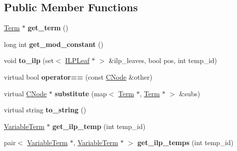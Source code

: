 \subsection*{\-Public \-Member \-Functions}
\begin{DoxyCompactItemize}
\item 
\hypertarget{classModLeaf_a5828eba46e2ec9de959db626779f3337}{\hyperlink{classTerm}{\-Term} $\ast$ {\bfseries get\-\_\-term} ()}\label{classModLeaf_a5828eba46e2ec9de959db626779f3337}

\item 
\hypertarget{classModLeaf_ae41cfdbd628e3ef2055527d7a9a332f4}{long int {\bfseries get\-\_\-mod\-\_\-constant} ()}\label{classModLeaf_ae41cfdbd628e3ef2055527d7a9a332f4}

\item 
\hypertarget{classModLeaf_a92f1a0251e0c32a27387ac2b9599a2c9}{void {\bfseries to\-\_\-ilp} (set$<$ \hyperlink{classILPLeaf}{\-I\-L\-P\-Leaf} $\ast$ $>$ \&ilp\-\_\-leaves, bool pos, int temp\-\_\-id)}\label{classModLeaf_a92f1a0251e0c32a27387ac2b9599a2c9}

\item 
\hypertarget{classModLeaf_a9edb8af1b7ff81da17b099391a435b26}{virtual bool {\bfseries operator==} (const \hyperlink{classCNode}{\-C\-Node} \&other)}\label{classModLeaf_a9edb8af1b7ff81da17b099391a435b26}

\item 
\hypertarget{classModLeaf_a415e2fed13664bf2b850bb76d068c843}{virtual \hyperlink{classCNode}{\-C\-Node} $\ast$ {\bfseries substitute} (map$<$ \hyperlink{classTerm}{\-Term} $\ast$, \hyperlink{classTerm}{\-Term} $\ast$ $>$ \&subs)}\label{classModLeaf_a415e2fed13664bf2b850bb76d068c843}

\item 
\hypertarget{classModLeaf_aea07a828e00ab8f36326e3bcc16eb72f}{virtual string {\bfseries to\-\_\-string} ()}\label{classModLeaf_aea07a828e00ab8f36326e3bcc16eb72f}

\item 
\hypertarget{classModLeaf_a313b14e933bbf213c3ff378e82919918}{\hyperlink{classVariableTerm}{\-Variable\-Term} $\ast$ {\bfseries get\-\_\-ilp\-\_\-temp} (int temp\-\_\-id)}\label{classModLeaf_a313b14e933bbf213c3ff378e82919918}

\item 
\hypertarget{classModLeaf_a4be49a149d49b10182179a5ca58cd417}{pair$<$ \hyperlink{classVariableTerm}{\-Variable\-Term} \*
$\ast$, \hyperlink{classVariableTerm}{\-Variable\-Term} $\ast$ $>$ {\bfseries get\-\_\-ilp\-\_\-temps} (int temp\-\_\-id)}\label{classModLeaf_a4be49a149d49b10182179a5ca58cd417}

\end{DoxyCompactItemize}
